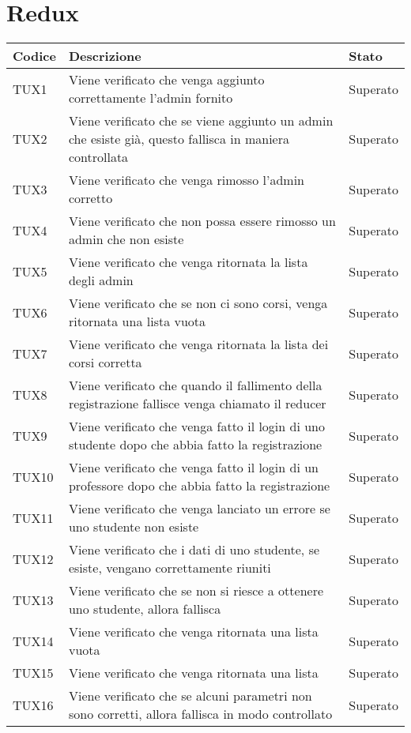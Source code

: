 \documentclass[PianoDiQualifica.tex]{subfiles}
\begin{document}
\section{Redux}
\begin{longtable}[H]{P{2cm}P{8.5cm}P{3cm}}
	\color{CHeaderText}\textbf{Codice} & 
	\color{CHeaderText}\textbf{Descrizione} & 
	\color{CHeaderText}\textbf{Stato}\\
	\endhead
	TUX1 & Viene verificato che venga aggiunto correttamente l'admin fornito & Superato \\ 
	TUX2 & Viene verificato che se viene aggiunto un admin che esiste già, questo fallisca in maniera controllata & Superato \\
	TUX3 & Viene verificato che venga rimosso l'admin corretto & Superato \\
	TUX4 & Viene verificato che non possa essere rimosso un admin che non esiste & Superato \\
	TUX5 & Viene verificato che venga ritornata la lista degli admin & Superato \\
	TUX6 & Viene verificato che se non ci sono corsi, venga ritornata una lista vuota & Superato \\
	TUX7 & Viene verificato che venga ritornata la lista dei corsi corretta & Superato \\
	TUX8 & Viene verificato che quando il fallimento della registrazione fallisce venga chiamato il reducer & Superato \\
	TUX9 & Viene verificato che venga fatto il login di uno studente dopo che abbia fatto la registrazione & Superato \\
	TUX10 & Viene verificato che venga fatto il login di un professore dopo che abbia fatto la registrazione & Superato \\
	TUX11 & Viene verificato che venga lanciato un errore se uno studente non esiste & Superato \\
	TUX12 & Viene verificato che i dati di uno studente, se esiste, vengano correttamente riuniti & Superato \\
	TUX13 & Viene verificato che se non si riesce a ottenere uno studente, allora fallisca & Superato \\
	TUX14 & Viene verificato che venga ritornata una lista vuota & Superato \\
	TUX15 & Viene verificato che venga ritornata una lista & Superato \\
	TUX16 & Viene verificato che se alcuni parametri non sono corretti, allora fallisca in modo controllato & Superato \\

\end{longtable}
\end{document}
